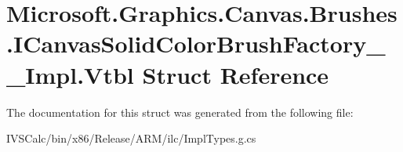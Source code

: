 \hypertarget{struct_microsoft_1_1_graphics_1_1_canvas_1_1_brushes_1_1_i_canvas_solid_color_brush_factory_____impl_1_1_vtbl}{}\section{Microsoft.\+Graphics.\+Canvas.\+Brushes.\+I\+Canvas\+Solid\+Color\+Brush\+Factory\+\_\+\+\_\+\+Impl.\+Vtbl Struct Reference}
\label{struct_microsoft_1_1_graphics_1_1_canvas_1_1_brushes_1_1_i_canvas_solid_color_brush_factory_____impl_1_1_vtbl}


The documentation for this struct was generated from the following file\+:\begin{DoxyCompactItemize}
\item 
I\+V\+S\+Calc/bin/x86/\+Release/\+A\+R\+M/ilc/Impl\+Types.\+g.\+cs\end{DoxyCompactItemize}

